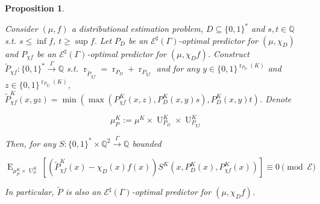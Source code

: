 \documentclass{article}
\numberwithin{equation}{section}
\theoremstyle{definition}
\theoremstyle{plain}
\newtheorem{proposition}{Proposition}[section]
\newcommand{\Bool}{\{0,1\}}
\newcommand{\Words}{{\Bool^*}}
\DeclareMathOperator{\E}{E}
\DeclareMathOperator{\R}{r}
\DeclareMathOperator{\Un}{U}
\newcommand{\Rats}{\mathbb{Q}}
\newcommand{\Fall}{\mathcal{E}}
\newcommand{\ESG}{\Fall^\sharp(\Gamma)}
\newcommand{\BoolR}[1]{\Bool^{\R_{#1}(K)}}
\newcommand{\Scheme}{\xrightarrow{\Gamma}}
\begin{document}
\begin{samepage}
\begin{proposition}
\label{prp:thm__cond__lemma}

Consider $(\mu, f)$ a distributional estimation problem, ${D \subseteq \Words}$ and $s, t \in \Rats$ s.t. ${s \leq \inf f}$, $t \geq \sup f$. Let $P_D$ be an $\ESG$-optimal predictor for $(\mu, \chi_D)$ and $P_{\chi f}$ be an $\ESG$-optimal predictor for $(\mu, \chi_D f)$. Construct $\tilde{P}_{\chi f}: \Words \Scheme \Rats$ s.t. $\R_{\tilde{P}_{\chi f}} = \R_{P_D} + \R_{P_{\chi f}}$ and for any ${y \in \BoolR{P_D}}$ and $z \in \BoolR{P_{\chi f}}$, ${\tilde{P}_{\chi f}^K(x,yz)=\min(\max(P_{\chi f}^K(x,z),P_D^K(x,y) s),P_D^K(x,y) t)}$. Denote 

\[\mu_P^K:=\mu^{K} \times \Un_{P_D}^K \times \Un_{P_{\chi f}}^K\] 

Then, for any $S: \Words \times \Rats^2 \Scheme \Rats$ bounded

\begin{equation}
\E_{\mu_P^K \times \Un_S^K}[(\tilde{P}_{\chi f}^K(x)-\chi_D(x)f(x))S^K(x,P_D^K(x),P_{\chi f}^K(x))]  \equiv 0 \pmod \Fall
\end{equation}

In particular, $\tilde{P}$ is also an $\ESG$-optimal predictor for $(\mu, \chi_D f)$.

\end{proposition}
\end{samepage}
\end{document}
